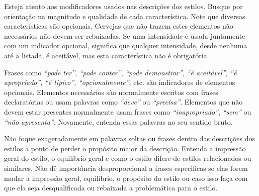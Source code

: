 Esteja atento aos modificadores usados nas descrições dos estilos. Busque por orientação na magnitude e qualidade de cada característica. Note que diversas características são opcionais. Cervejas que não trazem estes elementos não necessários não devem ser rebaixadas. Se uma intensidade é usada juntamente com um indicador opcional, significa que qualquer intensidade, desde nenhuma até a listada, é aceitável, mas esta característica não é obrigatória.

Frases como \textit{“pode ter”}, \textit{“pode conter”}, \textit{“pode demonstrar”}, \textit{“é aceitável”}, \textit{“é apropriado”}, \textit{“é típico”}, \textit{“opcionalmente”}, etc. são indicadores de elementos opcionais. Elementos necessários são normalmente escritos com frases declaratórias ou usam palavras como \textit{“deve”} ou \textit{“precisa”}. Elementos que não devem estar presentes normalmente usam frases como \textit{“inapropriado”}, \textit{“sem”} ou \textit{“não apresenta”}. Novamente, entenda essas palavras no seu sentido bruto.

Não foque exageradamente em palavras soltas ou frases dentro das descrições dos estilos a ponto de perder o propósito maior da descrição. Entenda a impressão geral do estilo, o equilíbrio geral e como o estilo difere de estilos relacionados ou similares. Não dê importância desproporcional a frases especificas se elas forem mudar a impressão geral, equilíbrio, o propósito do estilo ou caso isso faça com que ela seja desqualificada ou rebaixada a problemática para o estilo.